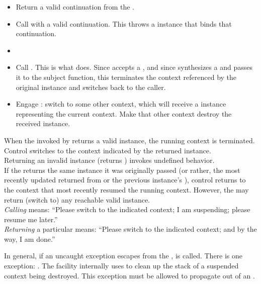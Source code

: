 \begin{itemize}
\item Return a valid continuation from the \entryfn.
\item Call \unwindcont with a valid continuation. This throws a \unwindex
instance that binds that continuation.
\item {}
\item
Call .
This is what \dtor does. Since \unwindcont accepts a \cont, and
since \resumewith synthesizes a \cont and passes it to the subject function,
this terminates the context referenced by the original \cont instance and
switches back to the caller.
\item Engage \dtor: switch to some other context, which will
receive a \cont instance representing the current context. Make that other
context destroy the received \cont instance.
\end{itemize}

When the \entryfn invoked by \callcc returns a valid \cont instance,
the running context is terminated. Control switches to the context
indicated by the returned \cont instance.\\
Returning an invalid \cont instance (\opbool returns ) invokes
undefined behavior.\\
If the \entryfn returns the same \cont instance it was originally
passed (or rather, the most recently updated \cont returned from \callcc or the
previous instance's \resume), control returns to the context that most
recently resumed the running context. However, the \entryfn may return (switch
to) any reachable valid \cont instance.\\

\emph{Calling} \contresume means: ``Please switch to the indicated context; I
am suspending; please resume me later.''\\

\emph{Returning} a particular \cont means: ``Please switch to the indicated
context; and by the way, I am done.''


\label{subsec:exceptions}
In general, if an uncaught exception escapes from
the \entryfn,  is called. There is one
exception: \unwindex. The \callcc facility internally uses \unwindex to clean
up the stack of a suspended context being destroyed. This exception must be
allowed to propagate out of an \entryfn.\\

